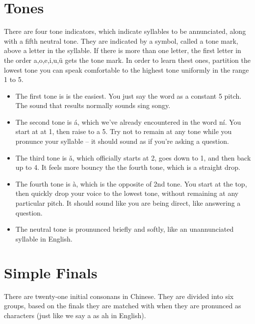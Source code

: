 \documentclass{article}
\begin{document}
\section{Tones}

There are four tone indicators, which indicate syllables to be annunciated, along with a fifth neutral tone. They are indicated by a symbol, called a tone mark, above a letter in the syllable. If there is more than one letter, the first letter in the order a,o,e,i,u,\"{u} gets the tone mark. In order to learn thest ones, partition the lowest tone you can speak comfortable to the highest tone uniformly in the range 1 to 5.

\begin{itemize}
    \item The first tone is  is the easiest. You just say the word as a constant 5 pitch. The sound that results normally sounds sing songy.
    \item The second tone is \'{a}, which we've already encountered in the word n\'{i}. You start at at 1, then raise to a 5. Try not to remain at any tone while you pronunce your syllable -- it should sound as if you're asking a question.
    \item The third tone is \v{a}, which officially starts at 2, goes down to 1, and then back up to 4. It feels more bouncy the the fourth tone, which is a straight drop.
    \item The fourth tone is \`{a}, which is the opposite of 2nd tone. You start at the top, then quickly drop your voice to the lowest tone, without remaining at any particular pitch. It should sound like you are being direct, like answering a question.
    \item The neutral tone is proununced briefly and softly, like an unannunciated syllable in English.
\end{itemize}

\section{Simple Finals}

There are twenty-one initial consonans in Chinese. They are divided into six groups, based on the finals they are matched with when they are pronunced as characters (just like we say a as ah in English).
\end{document}
